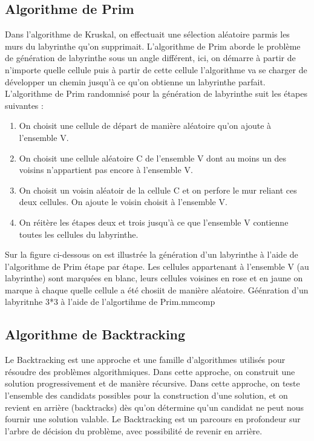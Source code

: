 \subsection{Algorithme de Prim}
Dans l'algorithme de Kruskal, on effectuait une sélection aléatoire parmis les murs du labyrinthe qu'on supprimait. L'algorithme de Prim aborde le problème de génération de labyrinthe sous un angle différent, ici, on démarre à partir de n'importe quelle cellule puis à partir de cette cellule l'algorithme va se charger de développer un chemin jusqu'à ce qu'on obtienne un labyrinthe parfait.
L'algorithme de Prim randomnisé pour la génération de labyrinthe suit les étapes suivantes :

\begin{enumerate}
    \item On choisit une cellule de départ de manière aléatoire qu'on ajoute à l'ensemble V.
    \item On choisit une cellule aléatoire C de l'ensemble V dont au moins un des voisins n'appartient pas encore à l'ensemble V. 
    \item On choisit un voisin aléatoir de la cellule C et on perfore le mur reliant ces deux cellules. On ajoute le voisin choisit à l'ensemble V. 
    \item On réitère les étapes deux et trois jusqu'à ce que l'ensemble V contienne toutes les cellules du labyrinthe.
\end{enumerate}
\newpage
Sur la figure ci-dessous on est illustrée la génération d'un labyrinthe à l'aide de l'algorithme de Prim étape par étape. Les cellules appartenant à l'ensemble V (au labyrinthe) sont marquées en blanc, leurs cellules voisines en rose et en jaune on marque à chaque quelle cellule a été chosiit de manière aléatoire.
{Géénration d'un labyritnhe 3*3 à l'aide de l'algortihme de Prim.}{mmcomp}

\subsection{Algorithme de Backtracking}
Le Backtracking est une approche et une famille d'algorithmes utilisés pour résoudre des problèmes algorithmiques. Dans cette approche, on construit une solution progressivement et de manière récursive. Dans cette approche, on teste l'ensemble des candidats possibles pour la construction d'une solution, et on revient en arrière (backtracks) dès qu'on détermine qu'un candidat ne peut nous fournir une solution valable. Le Backtracking est un parcours en profondeur sur l'arbre de décision du problème, avec possibilité de revenir en arrière.

